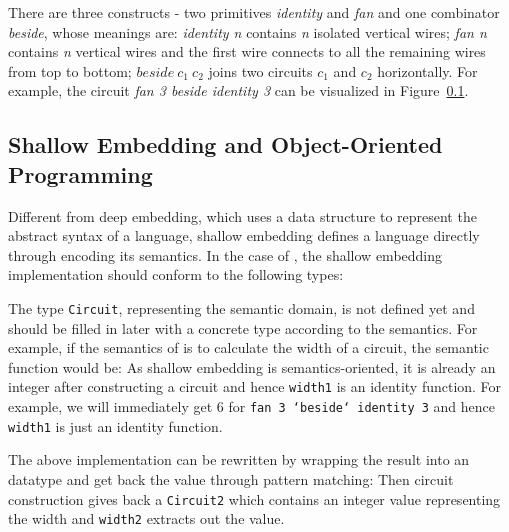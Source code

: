 


There are three constructs - two primitives
\emph{identity} and \emph{fan} and one combinator \emph{beside}, whose
meanings are: \emph{identity n} contains \emph{n} isolated vertical wires;
\emph{fan n} contains \emph{n} vertical wires and the first wire connects to
all the remaining wires from top to bottom; $beside\ c_1\ c_2$ joins two circuits
$c_1$ and $c_2$ horizontally.
For example, the circuit \emph{fan 3 beside identity 3} can be visualized in Figure~\ref{}.

\subsection{Shallow Embedding and Object-Oriented Programming}
Different from deep embedding, which uses a data structure to represent the
abstract syntax of a language, shallow embedding defines a language
directly through encoding its semantics. In the case of \dsl,
the shallow embedding implementation should conform to the following types:

The type \texttt{Circuit}, representing the semantic domain, is not defined yet
and should be filled in later with a concrete type according to the semantics.
For example, if the semantics of \dsl is to calculate the width of a
circuit, the semantic function would be:
As shallow embedding is semantics-oriented, it is already an integer after
constructing a circuit and hence \texttt{width1} is an identity function.
For example, we will immediately get $6$ for
\texttt{fan 3 `beside` identity 3} and hence \texttt{width1} is just an identity function.

The above implementation can be rewritten by wrapping the result into an
datatype and get back the value through pattern matching:
Then circuit construction gives back a \texttt{Circuit2} which contains an
integer value representing the width and \texttt{width2} extracts out the value.

